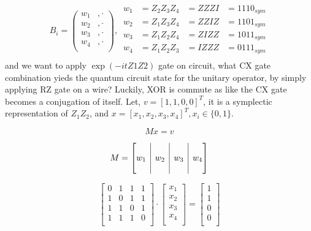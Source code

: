 \documentclass[a4paper,12pt]{article}
\newcommand{\rvline}{\hspace*{-\arraycolsep}\vline\hspace*{-\arraycolsep}}
\begin{document}
\begin{equation}
    B_i = \begin{pmatrix}
        w_1 &, \cdot \\
        w_2 &, \cdot \\
        w_3 &, \cdot \\
        w_4 &, \cdot \\
    \end{pmatrix},
    \,
    \begin{matrix}
        w_1 &= Z_2Z_3Z_4 &= ZZZI &= 1110_{sym}\\
        w_2 &= Z_1Z_3Z_4 &= ZZIZ &= 1101_{sym}\\
        w_3 &= Z_1Z_2Z_4 &= ZIZZ &= 1011_{sym}\\
        w_4 &= Z_1Z_2Z_3 &= IZZZ &= 0111_{sym}\\
    \end{matrix}
\end{equation}
and we want to apply $\exp(-i t Z1Z2)$ gate on circuit, what CX gate combination yieds
the quantum circuit state for the unitary operator, by simply applying RZ gate on a wire?
Luckily, XOR is commute as like the CX gate becomes a conjugation of itself.
Let, $v =[1, 1, 0, 0]^T$, it is a symplectic representation of $Z_1Z_2$,
and $x = [x_1, x_2, x_3, x_4]^T, x_i \in \{0, 1\}$. 

\begin{equation}
    M x = v
\end{equation}

\begin{equation}
    M = \begin{bmatrix}
            & \rvline &     & \rvline &      & \rvline &  \\
        w_1 & \rvline &  w_2& \rvline &  w_3 & \rvline &  w_4\\
            & \rvline &     & \rvline &      & \rvline &  \\
    \end{bmatrix}
\end{equation}

\begin{equation} 
    \begin{bmatrix}
        0 & 1 & 1 & 1 \\
        1 & 0 & 1 & 1 \\
        1 & 1 & 0 & 1 \\
        1 & 1 & 1 & 0 \\
\end{bmatrix} \cdot \begin{bmatrix}
        x_1 \\
        x_2 \\
        x_3 \\
        x_4 \\
    \end{bmatrix} 
    = 
    \begin{bmatrix}
        1 \\
        1 \\
        0 \\
        0 \\
    \end{bmatrix}
\end{equation}
\end{document}
